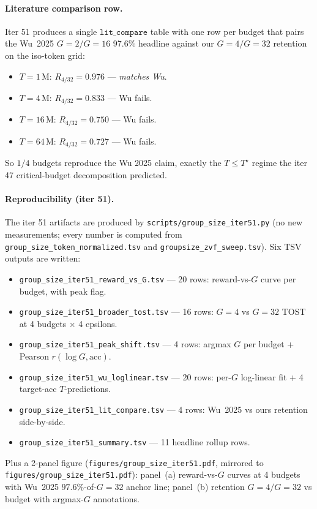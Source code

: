 \paragraph{Literature comparison row.}
Iter 51 produces a single $\texttt{lit\_compare}$ table with one row
per budget that pairs the Wu~2025 $G{=}2/G{=}16$ 97.6\% headline
against our $G{=}4/G{=}32$ retention on the iso-token grid:
\begin{itemize}
  \item $T{=}1$\,M: $R_{4/32} = 0.976$ — \emph{matches Wu}.
  \item $T{=}4$\,M: $R_{4/32} = 0.833$ — Wu fails.
  \item $T{=}16$\,M: $R_{4/32} = 0.750$ — Wu fails.
  \item $T{=}64$\,M: $R_{4/32} = 0.727$ — Wu fails.
\end{itemize}
So $1/4$ budgets reproduce the Wu 2025 claim, exactly the
$T{\le}T^\star$ regime the iter 47 critical-budget decomposition
predicted.

\paragraph{Reproducibility (iter 51).}
The iter 51 artifacts are produced by
\texttt{scripts/group\_size\_iter51.py} (no new measurements; every
number is computed from \texttt{group\_size\_token\_normalized.tsv}
and \texttt{groupsize\_zvf\_sweep.tsv}).  Six TSV outputs are
written:
\begin{itemize}
  \item \texttt{group\_size\_iter51\_reward\_vs\_G.tsv} --- 20 rows:
        reward-vs-$G$ curve per budget, with peak flag.
  \item \texttt{group\_size\_iter51\_broader\_tost.tsv} --- 16 rows:
        $G{=}4$ vs $G{=}32$ TOST at 4 budgets $\times$ 4 epsilons.
  \item \texttt{group\_size\_iter51\_peak\_shift.tsv} --- 4 rows:
        argmax $G$ per budget + Pearson $r(\log G, \text{acc})$.
  \item \texttt{group\_size\_iter51\_wu\_loglinear.tsv} --- 20 rows:
        per-$G$ log-linear fit + 4 target-acc $T$-predictions.
  \item \texttt{group\_size\_iter51\_lit\_compare.tsv} --- 4 rows:
        Wu~2025 vs ours retention side-by-side.
  \item \texttt{group\_size\_iter51\_summary.tsv} --- 11 headline
        rollup rows.
\end{itemize}
Plus a 2-panel figure (\texttt{figures/group\_size\_iter51.pdf},
mirrored to \texttt{figures/group\_size\_iter51.pdf}):
panel~(a) reward-vs-$G$ curves at 4 budgets with Wu~2025
$97.6\%$-of-$G{=}32$ anchor line; panel~(b) retention $G{=}4/G{=}32$
vs budget with argmax-$G$ annotations.

